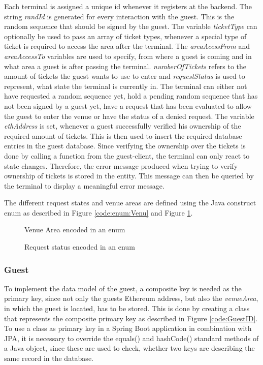 Each terminal is assigned a unique id whenever it registers at the backend. The string \textit{randId} is generated for every interaction with the guest. This is the random sequence that should be signed by the guest. The variable \textit{ticketType} can optionally be used to pass an array of ticket types, whenever a special type of ticket is required to access the area after the terminal. The \textit{areaAcessFrom} and \textit{areaAccessTo} variables are used to specify, from where a guest is coming and in what area a guest is after passing the terminal. \textit{numberOfTickets} refers to the amount of tickets the guest wants to use to enter and \textit{requestStatus} is used to represent, what state the terminal is currently in. The terminal can either not have requested a random sequence yet, hold a pending random sequence that has not been signed by a guest yet, have a request that has been evaluated to allow the guest to enter the venue or have the status of a denied request.
The variable \textit{ethAddress} is set, whenever a guest successfully verified his ownership of the required amount of tickets. This is then used to insert the required database entries in the guest database. Since verifying the ownership over the tickets is done by calling a function from the guest-client, the terminal can only react to state changes. Therefore, the error message produced when trying to verify ownership of tickets is stored in the entity. This message can then be queried by the terminal to display a meaningful error message. 

The different request states and venue areas are defined using the Java construct enum as described in Figure \ref{code:enum:Venu} and Figure \ref{code:enum:Req}.

\begin{figure}[H]
    
    \caption{Venue Area encoded in an enum}
    \label{code:enum:Venu}
    
    \caption{Request status encoded in an enum}
    \label{code:enum:Req}
\end{figure}

\subsubsection{Guest}
To implement the data model of the guest, a composite key is needed as the primary key, since not only the guests Ethereum address, but also the \textit{venueArea}, in which the guest is located, has to be stored. This is done by creating a class that represents the composite primary key as described in Figure \ref{code:GuestID}. To use a class as primary key in a Spring Boot application in combination with JPA, it is necessary to override the equals() and hashCode() standard methods of a Java object, since these are used to check, whether two keys are describing the same record in the database.

